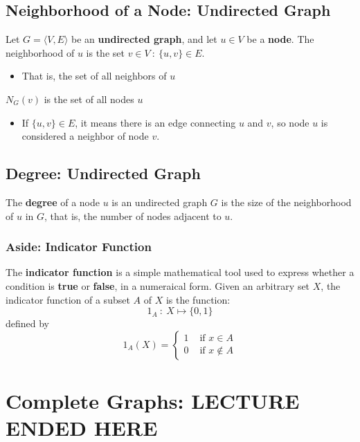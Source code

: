\documentclass[10pt]{article}
\begin{document}
\subsection*{Neighborhood of a Node: Undirected Graph}
Let $G = \langle V, E \rangle$ be an \textbf{undirected graph}, and let $u \in V$ be a \textbf{node}.  The neighborhood of $u$ is the set $v \in V \::\: \{u, v\} \in E$.
\begin{itemize}
	\item That is, the set of all neighbors of $u$
\end{itemize}
$N_G(v)$ is the set of all nodes $u$
\begin{itemize}
	\item If $\{u, v\} \in E$, it means there is an edge connecting $u$ and $v$, so node $u$ is considered a neighbor of node $v$.
\end{itemize}

\subsection*{Degree: Undirected Graph}
The \textbf{degree} of a node $u$ is an undirected graph $G$ is the size of the neighborhood of $u$ in $G$, that is, the number of nodes adjacent to $u$.

\subsubsection*{Aside: Indicator Function}
The \textbf{indicator function} is a simple mathematical tool used to express whether a condition is \textbf{true} or \textbf{false}, in a numeraical form.  Given an arbitrary set $X$, the indicator function of a subset $A$ of $X$ is the function:
\[1_A \::\: X \mapsto \{0, 1\}\]
defined by
\[1_A(X) = \begin{cases}1 &\text{ if }x \in A \\ 0 &\text{ if }x \notin A\end{cases}\]






\section*{Complete Graphs: LECTURE ENDED HERE}
\end{document}
